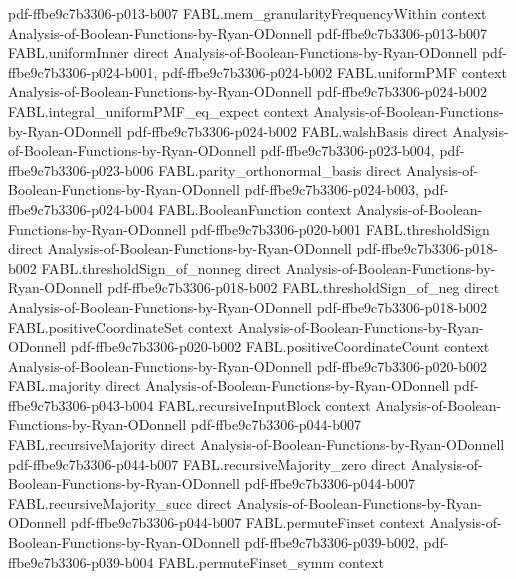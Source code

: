 \begin{theorem}
  {pdf-ffbe9c7b3306-p013-b007}
\proofstep
  {FABL.mem_granularityFrequencyWithin}
  {context}
  {Analysis-of-Boolean-Functions-by-Ryan-ODonnell}
  {pdf-ffbe9c7b3306-p013-b007}
\proofstep
  {FABL.uniformInner}
  {direct}
  {Analysis-of-Boolean-Functions-by-Ryan-ODonnell}
  {pdf-ffbe9c7b3306-p024-b001,
    pdf-ffbe9c7b3306-p024-b002}
\proofstep
  {FABL.uniformPMF}
  {context}
  {Analysis-of-Boolean-Functions-by-Ryan-ODonnell}
  {pdf-ffbe9c7b3306-p024-b002}
\proofstep
  {FABL.integral_uniformPMF_eq_expect}
  {context}
  {Analysis-of-Boolean-Functions-by-Ryan-ODonnell}
  {pdf-ffbe9c7b3306-p024-b002}
\proofstep
  {FABL.walshBasis}
  {direct}
  {Analysis-of-Boolean-Functions-by-Ryan-ODonnell}
  {pdf-ffbe9c7b3306-p023-b004,
    pdf-ffbe9c7b3306-p023-b006}
\proofstep
  {FABL.parity_orthonormal_basis}
  {direct}
  {Analysis-of-Boolean-Functions-by-Ryan-ODonnell}
  {pdf-ffbe9c7b3306-p024-b003,
    pdf-ffbe9c7b3306-p024-b004}
\proofstep
  {FABL.BooleanFunction}
  {context}
  {Analysis-of-Boolean-Functions-by-Ryan-ODonnell}
  {pdf-ffbe9c7b3306-p020-b001}
\proofstep
  {FABL.thresholdSign}
  {direct}
  {Analysis-of-Boolean-Functions-by-Ryan-ODonnell}
  {pdf-ffbe9c7b3306-p018-b002}
\proofstep
  {FABL.thresholdSign_of_nonneg}
  {direct}
  {Analysis-of-Boolean-Functions-by-Ryan-ODonnell}
  {pdf-ffbe9c7b3306-p018-b002}
\proofstep
  {FABL.thresholdSign_of_neg}
  {direct}
  {Analysis-of-Boolean-Functions-by-Ryan-ODonnell}
  {pdf-ffbe9c7b3306-p018-b002}
\proofstep
  {FABL.positiveCoordinateSet}
  {context}
  {Analysis-of-Boolean-Functions-by-Ryan-ODonnell}
  {pdf-ffbe9c7b3306-p020-b002}
\proofstep
  {FABL.positiveCoordinateCount}
  {context}
  {Analysis-of-Boolean-Functions-by-Ryan-ODonnell}
  {pdf-ffbe9c7b3306-p020-b002}
\proofstep
  {FABL.majority}
  {direct}
  {Analysis-of-Boolean-Functions-by-Ryan-ODonnell}
  {pdf-ffbe9c7b3306-p043-b004}
\proofstep
  {FABL.recursiveInputBlock}
  {context}
  {Analysis-of-Boolean-Functions-by-Ryan-ODonnell}
  {pdf-ffbe9c7b3306-p044-b007}
\proofstep
  {FABL.recursiveMajority}
  {direct}
  {Analysis-of-Boolean-Functions-by-Ryan-ODonnell}
  {pdf-ffbe9c7b3306-p044-b007}
\proofstep
  {FABL.recursiveMajority_zero}
  {direct}
  {Analysis-of-Boolean-Functions-by-Ryan-ODonnell}
  {pdf-ffbe9c7b3306-p044-b007}
\proofstep
  {FABL.recursiveMajority_succ}
  {direct}
  {Analysis-of-Boolean-Functions-by-Ryan-ODonnell}
  {pdf-ffbe9c7b3306-p044-b007}
\proofstep
  {FABL.permuteFinset}
  {context}
  {Analysis-of-Boolean-Functions-by-Ryan-ODonnell}
  {pdf-ffbe9c7b3306-p039-b002,
    pdf-ffbe9c7b3306-p039-b004}
\proofstep
  {FABL.permuteFinset_symm}
  {context}

\end{theorem}
